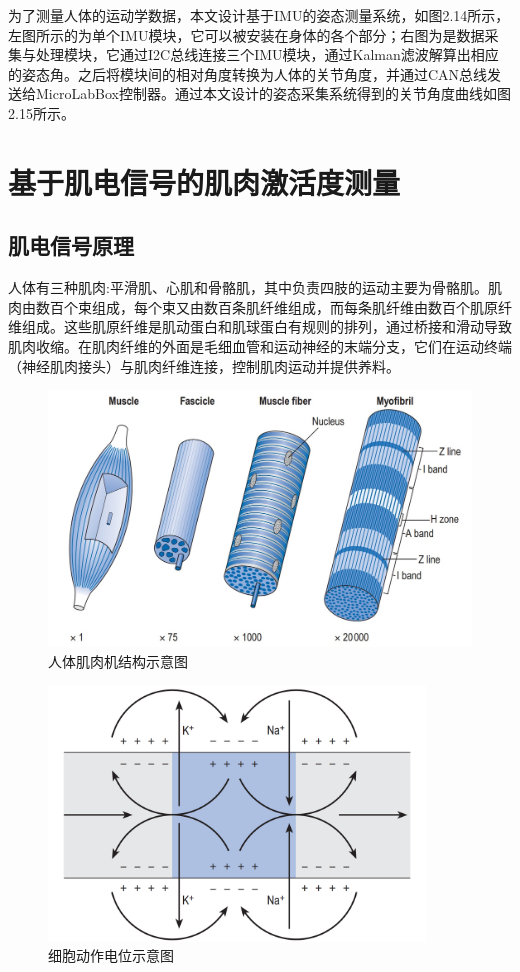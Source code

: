 为了测量人体的运动学数据，本文设计基于IMU的姿态测量系统，如图2.14所示，左图所示的为单个IMU模块，它可以被安装在身体的各个部分；右图为是数据采集与处理模块，它通过I2C总线连接三个IMU模块，通过Kalman滤波解算出相应的姿态角。之后将模块间的相对角度转换为人体的关节角度，并通过CAN总线发送给MicroLabBox控制器。通过本文设计的姿态采集系统得到的关节角度曲线如图2.15所示。

\section{基于肌电信号的肌肉激活度测量}
\subsection{肌电信号原理}

人体有三种肌肉:平滑肌、心肌和骨骼肌，其中负责四肢的运动主要为骨骼肌。肌肉由数百个束组成，每个束又由数百条肌纤维组成，而每条肌纤维由数百个肌原纤维组成。这些肌原纤维是肌动蛋白和肌球蛋白有规则的排列，通过桥接和滑动导致肌肉收缩。在肌肉纤维的外面是毛细血管和运动神经的末端分支，它们在运动终端（神经肌肉接头）与肌肉纤维连接，控制肌肉运动并提供养料。
\begin{figure}[htb]
    \includegraphics[width=12cm]{fig/f43.jpg}
    \caption{人体肌肉机结构示意图\cite{p44}}
    \label{fig:mark}
\end{figure}

\begin{figure}[htb]
    \includegraphics[width=10cm]{fig/f42.png}
    \caption{细胞动作电位示意图\cite{p44}}
    \label{fig:mark}
\end{figure}

